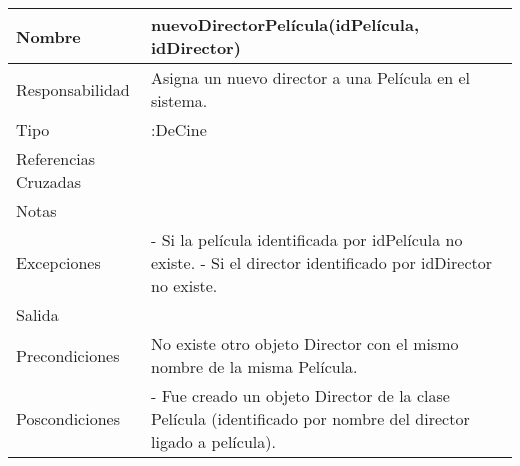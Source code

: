 \documentclass{article}
\begin{document}
\begin{table}[h]
\begin{tabular}{|l|l|l|l|l|l|}
\hline
\multicolumn{2}{|p{3cm}|}{Nombre} & \multicolumn{3}{p{8cm}|}{\textbf{nuevoDirectorPelícula(idPelícula, idDirector)}}\\
\hline
\multicolumn{2}{|p{3cm}|}{Responsabilidad} & \multicolumn{4}{p{8cm}|}{Asigna un nuevo director a una Película en el sistema.} \\
\hline
\multicolumn{2}{|p{3cm}|}{Tipo} & \multicolumn{4}{p{8cm}|}{:DeCine} \\
\hline
\multicolumn{2}{|p{3cm}|}{Referencias Cruzadas} & \multicolumn{4}{p{8cm}|}{} \\
\hline
\multicolumn{2}{|p{3cm}|}{Notas} & \multicolumn{4}{p{8cm}|}{} \\
\hline
\multicolumn{2}{|p{3cm}|}{Excepciones} & \multicolumn{4}{p{8cm}|}{- Si la película identificada por idPelícula no existe.
- Si el director identificado por idDirector no existe.
} \\
\hline
\multicolumn{2}{|p{3cm}|}{Salida} & \multicolumn{4}{p{8cm}|}{} \\
\hline
\multicolumn{2}{|p{3cm}|}{Precondiciones} & \multicolumn{4}{p{8cm}|}{No existe otro objeto Director con el mismo nombre de la misma Película.} \\
\hline
\multicolumn{2}{|p{3cm}|}{Poscondiciones} & \multicolumn{4}{p{8cm}|}{- Fue creado un objeto Director de la clase Película (identificado por nombre del director ligado a película).} \\
\hline
\end{tabular}
\end{table}
\end{document}
